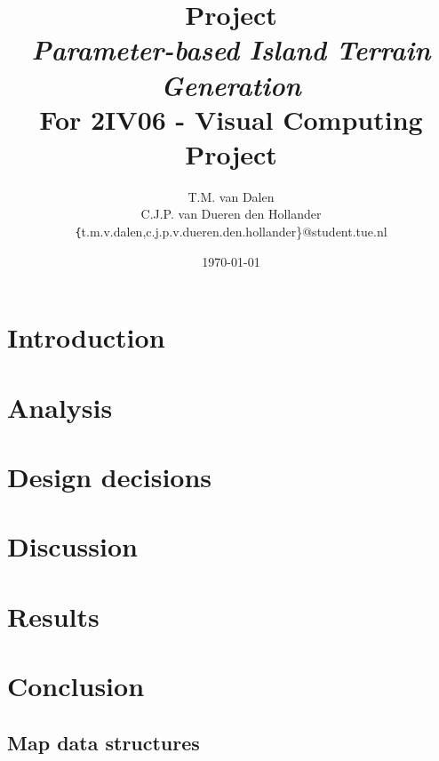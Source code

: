 \documentclass[11pt,a4paper,twocolumn]{article}
\title{
	{\huge Project\\ \emph{Parameter-based Island Terrain Generation}}\\
	{\large For 2IV06 - Visual Computing Project}
}
\author{
	T.M. van Dalen \\
	C.J.P. van Dueren den Hollander\\
	{\texttt\{t.m.v.dalen,c.j.p.v.dueren.den.hollander\}}@student.tue.nl
}
\date{\today}
\begin{document}
	\maketitle
	
	
	
	\section{Introduction}
	\label{sec:intro}
	
	
	\section{Analysis}
	\label{sec:analysis}
	
	
	\section{Design decisions}
	\label{sec:choices}
	
	
	\section{Discussion}
	\label{sec:discussion}
	
	
	\section{Results}
	\label{sec:results}
	
	
	\section{Conclusion}
	\label{sec:conclusion}
	

	\begin{appendices}
	\section{Map data structures}
	\label{appendix:mapdatastructures}
	
	\end {appendices}

	
	
\end{document}
